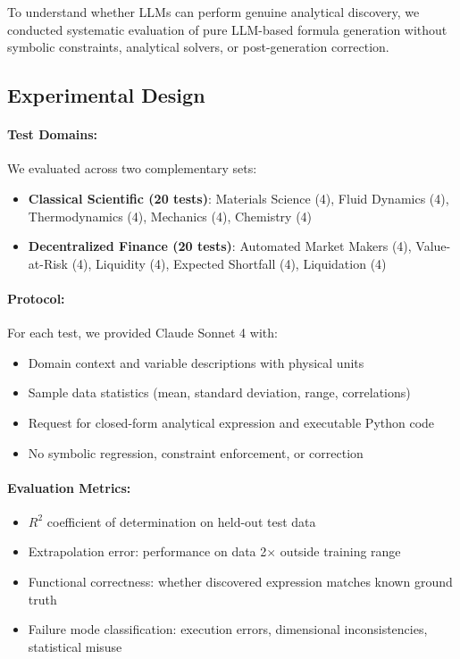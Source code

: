\documentclass[twoside,11pt]{article}
\begin{document}
To understand whether LLMs can perform genuine analytical discovery, we conducted systematic evaluation of pure LLM-based formula generation without symbolic constraints, analytical solvers, or post-generation correction\citep{koza1994genetic}\citep{kambhampati2024llms}.

\subsection{Experimental Design}

\paragraph{Test Domains:} We evaluated across two complementary sets:

\begin{itemize}
\item \textbf{Classical Scientific (20 tests)}: Materials Science (4), Fluid Dynamics (4), Thermodynamics (4), Mechanics (4), Chemistry (4)\citep{virtanen2020scipy}
\item \textbf{Decentralized Finance (20 tests)}: Automated Market Makers (4), Value-at-Risk (4), Liquidity (4), Expected Shortfall (4), Liquidation (4)
\end{itemize}

\paragraph{Protocol:} For each test, we provided Claude Sonnet 4 with:
\begin{itemize}
\item Domain context and variable descriptions with physical units
\item Sample data statistics (mean, standard deviation, range, correlations)
\item Request for closed-form analytical expression and executable Python code
\item No symbolic regression, constraint enforcement, or correction\citep{la2021contemporary}
\end{itemize}

\paragraph{Evaluation Metrics:}
\begin{itemize}
\item $R^2$ coefficient of determination on held-out test data
\item Extrapolation error: performance on data 2$\times$ outside training range
\item Functional correctness: whether discovered expression matches known ground truth
\item Failure mode classification: execution errors, dimensional inconsistencies, statistical misuse
\end{itemize}
\end{document}
